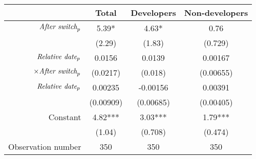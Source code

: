 \begin{tabular}{|r|c|c|c|}
\hline
&  Total & Developers & Non-developers \\
\hline
$\mbox{\emph{After switch}}_p$ & 5.39* & 4.63* & 0.76 \\
 & (2.29) & (1.83) & (0.729) \\
\hline
$\mbox{\emph{Relative date}}_p$ & 0.0156 & 0.0139 & 0.00167 \\
$\times \mbox{\emph{After switch}}_p$ & (0.0217) & (0.018) & (0.00655) \\
\hline
$\mbox{\emph{Relative date}}_p$ & 0.00235 & -0.00156 & 0.00391 \\
 & (0.00909) & (0.00685) & (0.00405) \\
\hline
Constant & 4.82*** & 3.03*** & 1.79*** \\
 & (1.04) & (0.708) & (0.474) \\
\hline
Observation number & 350 & 350 & 350 \\
\hline
\end{tabular}
